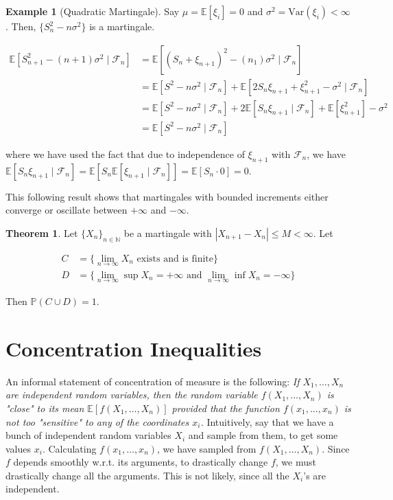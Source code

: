 \documentclass{article}
\theoremstyle{definition}
\newtheorem{theorem}{Theorem}[section]
\newtheorem{example}{Example}[section]
\theoremstyle{remark}
\theoremstyle{definition}
\begin{document}
  \begin{example}[Quadratic Martingale]
  Say $\mu = \mathbb{E}[\xi_i] = 0$ and $\sigma^2 = \mathrm{Var}(\xi_i) < \infty$. Then, $\{S_n^2 - n \sigma^2\}$ is a martingale. 

  \begin{align*}
    \mathbb{E}[S_{n+1}^2 - (n + 1) \sigma^2 \mid \mathcal{F}_n] & = \mathbb{E}[ (S_n + \xi_{n+1})^2 - (n _ 1) \sigma^2 \mid \mathcal{F}_n] \\
    & = \mathbb{E}[S^2 - n \sigma^2 \mid \mathcal{F}_n ] + \mathbb{E}[ 2 S_n \xi_{n+1} + \xi_{n+1}^2 - \sigma^2 \mid \mathcal{F}_n] \\
    & = \mathbb{E}[S^2 - n \sigma^2 \mid \mathcal{F}_n ] + 2 \mathbb{E}[ S_n \xi_{n+1} \mid \mathcal{F}_n ] + \mathbb{E}[\xi_{n+1}^2] - \sigma^2  \\
    & = \mathbb{E}[S^2 - n \sigma^2 \mid \mathcal{F}_n ]
  \end{align*}

  where we have used the fact that due to independence of $\xi_{n+1}$ with $\mathcal{F}_n$, we have $\mathbb{E}[S_n \xi_{n+1} \mid \mathcal{F}_n] = \mathbb{E}[S_n \mathbb{E}[ \xi_{n+1} \mid \mathcal{F}_n]] = \mathbb{E}[S_n \cdot 0] = 0$. 
  \end{example}

  This following result shows that martingales with bounded increments either converge or oscillate between $+\infty$ and $-\infty$. 

  \begin{theorem}
    Let $\{X_n\}_{n \in \mathbb{N}}$ be a martingale with $|X_{n+1} - X_n| \leq M < \infty$. Let 

    \begin{align*}
      C & = \{\lim_{n \rightarrow \infty} X_n \text{ exists and is finite}\} \\
      D & = \{\lim_{n \rightarrow \infty} \sup X_n = +\infty \text{ and } \lim_{n \rightarrow \infty} \inf X_n = -\infty\}
    \end{align*}

    Then $\mathbb{P}(C \cup D) = 1$. 
  \end{theorem}

\section{Concentration Inequalities}

  An informal statement of concentration of measure is the following: \textit{If $X_1, \ldots, X_n$ are independent random variables, then the random variable $f(X_1, \ldots, X_n)$ is "close" to its mean $\mathbb{E}[f(X_1, \ldots, X_n)]$ provided that the function $f(x_1, \ldots, x_n)$ is not too "sensitive" to any of the coordinates $x_i$.} Intuitively, say that we have a bunch of independent random variables $X_i$ and sample from them, to get some values $x_i$. Calculating $f(x_1, \ldots, x_n)$, we have sampled from $f(X_1, \ldots, X_n)$. Since $f$ depends smoothly w.r.t. its arguments, to drastically change $f$, we must drastically change all the arguments. This is not likely, since all the $X_i$'s are independent. 
\end{document}
